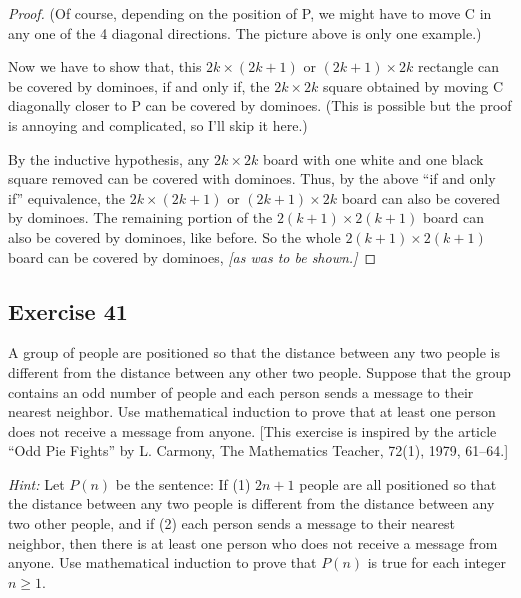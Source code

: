 \documentclass[14pt]{extarticle}
\begin{document}
\begin{proof}
    (Of course, depending on the position of P, we might have to move C in any one of the 4 diagonal directions. The picture above is only one example.)

    Now we have to show that, this $2k \times (2k+1)$ or $(2k+1) \times 2k$ rectangle can be covered by dominoes, if and only if, the $2k \times 2k$ square obtained by moving C diagonally closer to P can be covered by dominoes. (This is possible but the proof is annoying and complicated, so I'll skip it here.)

    By the inductive hypothesis, any $2k \times 2k$ board with one white and one black square removed can be covered with dominoes. Thus, by the above ``if and only if'' equivalence, the $2k \times (2k+1)$ or $(2k+1) \times 2k$ board can also be covered by dominoes. The remaining portion of the $2(k+1) \times 2(k+1)$ board can also be covered by dominoes, like before. So the whole $2(k+1) \times 2(k+1)$ board can be covered by dominoes, {\it [as was to be shown.]}
\end{proof}

\subsection{Exercise 41}
A group of people are positioned so that the distance between any two people is different from the distance between any other two people. Suppose that the group contains an odd number of people and each person sends a message to their nearest neighbor. Use mathematical induction to prove that at least one person does not receive a message from anyone. [This exercise is inspired by the article “Odd Pie Fights” by L. Carmony, The Mathematics Teacher, 72(1), 1979, 61–64.]

    {\it Hint:} Let $P(n)$ be the sentence: If (1) $2n + 1$ people are all positioned so that the distance between any two people is different from the distance between any two other people, and if (2) each person sends a message to their nearest neighbor, then there is at least one person who does not receive a message from anyone. Use mathematical induction to prove that $P(n)$ is true for each integer $n \geq 1$.
\end{document}
